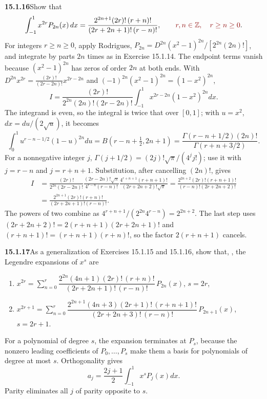 \par\bigskip
\noindent\textbf{15.1.16}\quad Show that
\[
\int_{-1}^{1}x^{2r}P_{2n}(x)\,dx
=\frac{2^{2n+1}(2r)!\,(r+n)!}{(2r+2n+1)!\,(r-n)!},\qquad \erratum{r,n\in\mathbb Z,\quad r\ge n\ge0}.
\]
\solution
For integers $r\ge n\ge0$, apply Rodrigues,
$P_{2n}=D^{2n}(x^2-1)^{2n}/[2^{2n}(2n)!]$, and integrate by parts $2n$
times as in Exercise 15.1.14. The endpoint terms vanish because
$(x^2-1)^{2n}$ has zeros of order $2n$ at both ends. With
$D^{2n}x^{2r}=\frac{(2r)!}{(2r-2n)!}x^{2r-2n}$ and
$(-1)^{2n}(x^2-1)^{2n}=(1-x^2)^{2n}$,
\[
I=\frac{(2r)!}{2^{2n}(2n)!(2r-2n)!}
\int_{-1}^1x^{2r-2n}(1-x^2)^{2n}dx.
\]
The integrand is even, so the integral is twice that over $[0,1]$;
with $u=x^2$, $dx=du/(2\sqrt u)$, it becomes
\[
\int_0^1u^{r-n-1/2}(1-u)^{2n}du=B(r-n+\tfrac12,2n+1)
=\frac{\Gamma(r-n+1/2)(2n)!}{\Gamma(r+n+3/2)}.
\]
For a nonnegative integer $j$,
$\Gamma(j+1/2)=(2j)!\sqrt\pi/(4^jj!)$; use it with $j=r-n$ and
$j=r+n+1$. Substitution, after cancelling $(2n)!$, gives
\begin{align*}
I&=\frac{(2r)!}{2^{2n}(2r-2n)!}
\frac{(2r-2n)!\sqrt\pi}{4^{r-n}(r-n)!}
\frac{4^{r+n+1}(r+n+1)!}{(2r+2n+2)!\sqrt\pi}
=\frac{2^{2n+2}(2r)!(r+n+1)!}{(r-n)!(2r+2n+2)!}\\
&=\boxed{\frac{2^{2n+1}(2r)!(r+n)!}
{(2r+2n+1)!(r-n)!}}.
\end{align*}
The powers of two combine as
$4^{r+n+1}/(2^{2n}4^{r-n})=2^{2n+2}$. The last step uses
$(2r+2n+2)!=2(r+n+1)(2r+2n+1)!$ and $(r+n+1)!=(r+n+1)(r+n)!$, so the
factor $2(r+n+1)$ cancels.

\par\bigskip
\noindent\textbf{15.1.17}\quad As a generalization of Exercises 15.1.15
and 15.1.16, show that, ,
the Legendre expansions of $x^{s}$ are
\begin{enumerate}
\item[(a)] $x^{2r}=\displaystyle\sum_{n=0}^{r}
\dfrac{2^{2n}(4n+1)(2r)!\,(r+n)!}{(2r+2n+1)!\,(r-n)!}\,P_{2n}(x)$,
\quad$s=2r$,
\item[(b)] $x^{2r+1}=\displaystyle\sum_{n=0}^{r}
\dfrac{2^{2n+1}(4n+3)(2r+1)!\,(r+n+1)!}{(2r+2n+3)!\,(r-n)!}\,P_{2n+1}(x)$,
\quad$s=2r+1$.
\end{enumerate}
\solution
For a polynomial of degree $s$, the expansion terminates at $P_s$,
because the nonzero leading coefficients of $P_0,\ldots,P_s$ make
them a basis for polynomials of degree at most $s$.
Orthogonality gives
\[
a_j=\frac{2j+1}{2}\int_{-1}^1x^sP_j(x)dx.
\]
Parity eliminates all $j$ of parity opposite to $s$.

